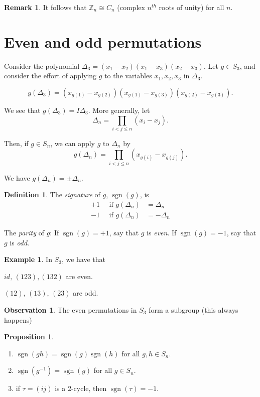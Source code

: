 \documentclass{article}
\theoremstyle{definition}
\newtheorem*{definition}{Definition}
\newtheorem{proposition}[theorem]{Proposition}
\newtheorem*{remark}{Remark}
\newtheorem*{exmp}{Example}
\newtheorem*{obvs}{Observation}
\newcommand{\dtn}{\Delta_n}
\newcommand{\ism}{\cong}
\DeclareMathOperator{\sgn}{sgn}
\begin{document}
\begin{remark}
  It follows that $\mathbb{Z}_n \ism C_n$ (complex $n^{th}$ roots of unity) for all $n$.
\end{remark}

\section{Even and odd permutations}

Consider the polynomial $\Delta_3 = (x_1 - x_2)(x_1 - x_3) (x_2 - x_3)$. 
Let $g \in S_3$, and consider the effort of applying $g$ to the variables $x_1, x_2, x_3$ in $\Delta_3$.

$$g(\Delta_3) = (x_{g(1)} - x_{g(2)})(x_{g(1)} - x_{g(3)})(x_{g(2)} - x_{g(3)}).$$

\noindent We see that $g(\Delta_3)=I\Delta_3$. More generally, let $$\Delta_n = \prod_{i<j\leq n} (x_i - x_j ). $$ 

\noindent Then, if $g \in S_n$, we can apply $g$ to $\Delta_n$ by 
$$g(\Delta_n) = \prod_{i<j\leq n}(x_{g(i)} - x_{g(j)}).$$

\noindent We have $g(\Delta_n) = \pm\Delta_n$.\\
\begin{definition}
  The \emph{signature} of $g$, $\sgn(g)$, is 
  \begin{align*}
    +1 \quad \text{ if } g(\dtn) &= \dtn \\
    -1 \quad \text{ if } g(\dtn) &= -\dtn
  \end{align*}
\end{definition}

The \emph{parity} of $g$: If $\sgn(g)=+1$, say that $g$ is \emph{even}.
If $\sgn(g)=-1$, say that $g$ is \emph{odd}.\\

\begin{exmp}
  
In $S_3$, we have that 

$id,\,(1 2 3), (1 3 2)$ are even.

$(1 2),\, (1 3),\,(2 3)$ are odd.\\
\end{exmp}
\begin{obvs}
  
The even permutations in $S_3$ form a subgroup (this always happens)\\
\end{obvs}


\begin{proposition}
  \label{prp:sgn}\hfill
  \begin{enumerate}
    \item $\sgn(gh)=\sgn(g)\sgn(h)$ for all $g,h \in S_n$.
    \item $\sgn(g^{-1})=\sgn(g)$ for all $g \in S_n$.
    \item if $\tau=(i j)$ is a 2-cycle, then $\sgn(\tau)=-1$.
  \end{enumerate}
\end{proposition}
\end{document}
